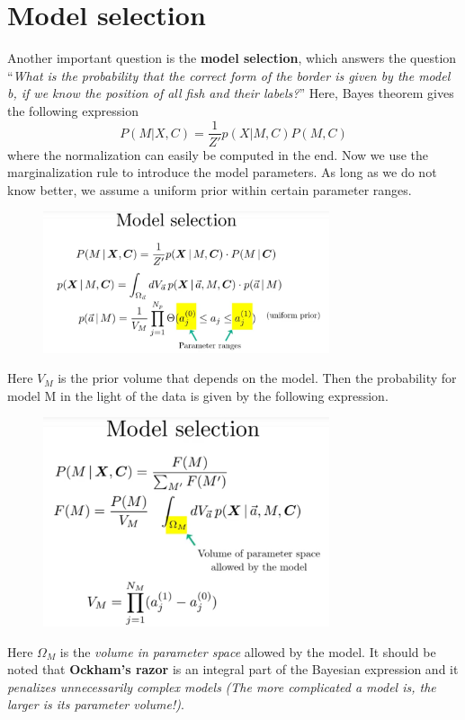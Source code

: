 \documentclass[12pt, a4paper]{scrartcl}
\begin{document}
\section*{Model selection}
Another important question is the \textbf{model selection}, which answers the question ``\textit{What is the
probability that the correct form of the border is given by the model b, if we
know the position of all fish and their labels?}'' Here, Bayes theorem gives the following expression 
\[P(M|X,C)=\frac{1}{Z'}p(X|M,C)P(M,C)\]
where the normalization can easily be computed in the end.
Now we use the marginalization rule to introduce the model parameters.
As long as we do not know better, we assume a uniform prior within certain
parameter ranges.\\%
\begin{figure}[H]
	\centering
	\includegraphics[width=0.75\textwidth]{7_18.png}
\end{figure}

Here $V_M$ is the prior volume that depends on the model.
Then the probability for model M in the light of the data is given by the following expression. %
\begin{figure}[H]
	\centering
	\includegraphics[width=0.75\textwidth]{7_19.png}
\end{figure}
Here $\Omega_M$ is the \textit{volume in parameter space} allowed by the model.
It should be noted that \textbf{Ockham's razor} is an integral part of the Bayesian expression 
and it \textit{penalizes unnecessarily complex models} \textit{(The more complicated a model is, the larger is its parameter volume!)}.\\
 
\end{document}
